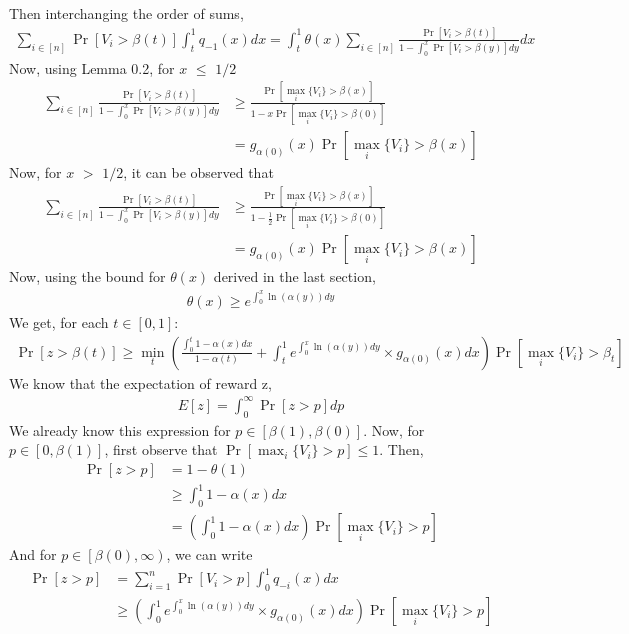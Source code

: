 \documentclass[10pt, letterpaper, twoside]{article}
\begin{document}
	Then interchanging the order of sums,
	\begin{align*}
	\sum_{i \in [n]} \Pr[V_{i} > \beta(t)] \int_{t}^{1} q_{-1}(x) dx = \int_{t}^{1} \theta(x) \sum_{i \in [n]} \frac{\Pr[V_{i} > \beta(t)]}{1 - \int_{0}^{x} \Pr[V_{i} > \beta(y)] dy} dx
	\end{align*}
	Now, using Lemma 0.2, for $x$ $\leq$ $1/2$
	\begin{align*}
	\sum_{i \in [n]} \frac{\Pr[V_{i} > \beta(t)]}{1 - \int_{0}^{x} \Pr[V_{i} > \beta(y)] dy} &\geq \frac{\Pr[\max_{i} \{V_{i}\} > \beta(x)]}{1-x\Pr[\max_{i} \{V_{i}\} > \beta(0)]}\\
	&= g_{\alpha(0)} (x) \Pr[\max_{i} \{V_{i}\} > \beta(x)]
	\end{align*}
	Now, for $x$ $>$ $1/2$, it can be observed that \\
	\begin{align*}
	\sum_{i \in [n]} \frac{\Pr[V_{i} > \beta(t)]}{1 - \int_{0}^{x} \Pr[V_{i} > \beta(y)] dy} &\geq \frac{\Pr[\max_{i} \{V_{i}\} > \beta(x)]}{1-\frac{1}{2}\Pr[\max_{i} \{V_{i}\} > \beta(0)]} \\
	&= g_{\alpha(0)} (x) \Pr[\max_{i} \{V_{i}\} > \beta(x)]
	\end{align*}
	Now, using the bound for $\theta(x)$ derived in the last section,
	\begin{align*}
	\theta(x) \geq e^{\int_{0}^{x} \ln(\alpha(y)) dy}
	\end{align*}
	We get, for each $t \in [0,1]$:
	\begin{align*}
	\Pr[z > \beta(t)] \geq \min_{t}\left(\frac{\int_{0}^{t} 1 - \alpha(x) dx}{1-\alpha(t)} + \int_{t}^{1} e^{\int_{0}^{x} \ln(\alpha(y)) dy} \times g_{\alpha(0)}(x) dx \right) \Pr[\max_{i} \{V_{i}\} > \beta_{t}]
	\end{align*}
	We know that the expectation of reward z,
	\begin{align*}
	E[z] = \int_{0}^{\infty} \Pr[z > p] dp
	\end{align*}
	We already know this expression for $p \in [\beta(1),\beta(0)]$. Now, for $p \in [0,\beta(1)]$, first observe that $\Pr[\max_{i} \{V_{i}\} > p]\leq 1$. Then,
	\begin{align*}
	\Pr[z > p] &= 1 - \theta(1)\\
	&\geq \int_{0}^{1} 1 - \alpha(x) dx \\
	&=\left(\int_{0}^{1} 1 - \alpha(x) dx \right) \Pr[\max_{i} \{V_{i}\} > p]
	\end{align*}
	And for $p \in\left [\beta(0),\infty\right)$, we can write
	\begin{align*}
	\Pr[z > p] &= \sum_{i=1}^{n} \Pr[V_{i} > p] \int_{0}^{1} q_{-i} (x) dx\\
	&\geq \left(\int_{0}^{1} e^{\int_{0}^{x} \ln(\alpha(y)) dy} \times g_{\alpha(0)}(x) dx \right) \Pr[\max_{i} \{V_{i}\} > p]
	\end{align*}
\end{document}
